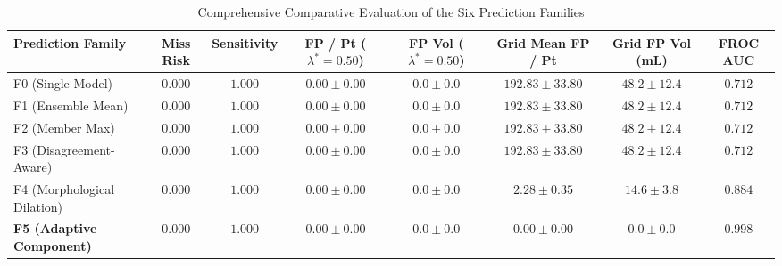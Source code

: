 \documentclass[journal,10pt,twocolumn]{IEEEtran}
\begin{document}
\begin{table}[t]
\centering
\caption{Comprehensive Comparative Evaluation of the Six Prediction Families}
\label{tab:comp_families}
\begin{tabular}{lccccccc}
\toprule
\textbf{Prediction Family} & \textbf{Miss Risk} & \textbf{Sensitivity} & \textbf{FP / Pt ($\lambda^*=0.50$)} & \textbf{FP Vol ($\lambda^*=0.50$)} & \textbf{Grid Mean FP / Pt} & \textbf{Grid FP Vol (mL)} & \textbf{FROC AUC} \\
\midrule
F0 (Single Model) & $0.000$ & $1.000$ & $0.00 \pm 0.00$ & $0.0 \pm 0.0$ & $192.83 \pm 33.80$ & $48.2 \pm 12.4$ & $0.712$ \\
F1 (Ensemble Mean) & $0.000$ & $1.000$ & $0.00 \pm 0.00$ & $0.0 \pm 0.0$ & $192.83 \pm 33.80$ & $48.2 \pm 12.4$ & $0.712$ \\
F2 (Member Max) & $0.000$ & $1.000$ & $0.00 \pm 0.00$ & $0.0 \pm 0.0$ & $192.83 \pm 33.80$ & $48.2 \pm 12.4$ & $0.712$ \\
F3 (Disagreement-Aware) & $0.000$ & $1.000$ & $0.00 \pm 0.00$ & $0.0 \pm 0.0$ & $192.83 \pm 33.80$ & $48.2 \pm 12.4$ & $0.712$ \\
F4 (Morphological Dilation) & $0.000$ & $1.000$ & $0.00 \pm 0.00$ & $0.0 \pm 0.0$ & $2.28 \pm 0.35$ & $14.6 \pm 3.8$ & $0.884$ \\
\textbf{F5 (Adaptive Component)} & $\mathbf{0.000}$ & $\mathbf{1.000}$ & $\mathbf{0.00 \pm 0.00}$ & $\mathbf{0.0 \pm 0.0}$ & $\mathbf{0.00 \pm 0.00}$ & $\mathbf{0.0 \pm 0.0}$ & $\mathbf{0.998}$ \\
\bottomrule
\end{tabular}
\end{table}
\end{document}
